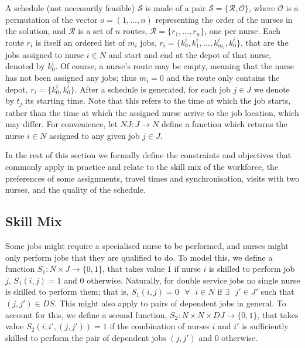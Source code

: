 \documentclass[a4paper,11pt,authoryear]{elsarticle}
\begin{document}

A schedule (not necessarily feasible) $\mathcal{S}$ is made of a pair $\mathcal{S} = \{\mathcal{R}, \mathcal{O}\}$, where $\mathcal{O}$ is a permutation of the vector $o = (1,\dots,n)$ representing the order of the nurses in the solution, and $\mathcal{R}$ is a set of $n$ routes, $\mathcal{R} = \{r_1,\dots,r_n\}$, one per nurse. Each route $r_i$ is itself an ordered list of $m_i$ jobs, $r_i = \{k^i_0, k^i_1,\dots,k^i_{m_i}, k^i_0\}$, that are the jobs assigned to nurse $i \in N$ and start and end at the depot of that nurse, denoted by $k^i_0$. Of course, a nurse's route may be empty, meaning that the nurse has not been assigned any jobs; thus $m_i = 0$ and the route only contains the depot, $r_i = \{k^i_0, k^i_0\}$. After a schedule is generated, for each job $j \in J$ we denote by $t_j$ its starting time. Note that this refers to the time at which the job starts, rather than the time at which the assigned nurse arrive to the job location, which may differ. For convenience, let $NJ : J \to N$ define a function which returns the nurse $i \in N$ assigned to any given job $j \in J$.

In the rest of this section we formally define the constraints and objectives that commonly apply in practice and relate to the skill mix of the workforce, the preferences of some assignments, travel times and synchronisation, visits with two nurses, and the quality of the schedule.

\subsection{Skill Mix}
\label{sub:skillmix}
\noindent Some jobs might require a specialised nurse to be performed, and nurses might only perform jobs that they are qualified to do. To model this, we define a function $S_1: N\times J \rightarrow \{0,1\}$, that takes value $1$ if nurse $i$ is skilled to perform job $j$, $S_1(i,j) = 1$ and $0$ otherwise. 
Naturally, for double service jobs no single nurse is skilled to perform them; that is, $S_1(i,j) = 0 \text{ } \forall \text{ } i \in N \text{ if }\exists \text{ } j' \in J'$ such that $(j, j') \in DS$. This might also apply to pairs of dependent jobs in general. To account for this, we define a second function, $S_2: N\times N\times DJ \rightarrow \{0,1\}$, that takes value $S_2(i,i',(j, j')) = 1$ if the combination of nurses $i$ and $i'$ is sufficiently skilled to perform the pair of dependent jobs $(j, j')$ and $0$ otherwise.
\end{document}
